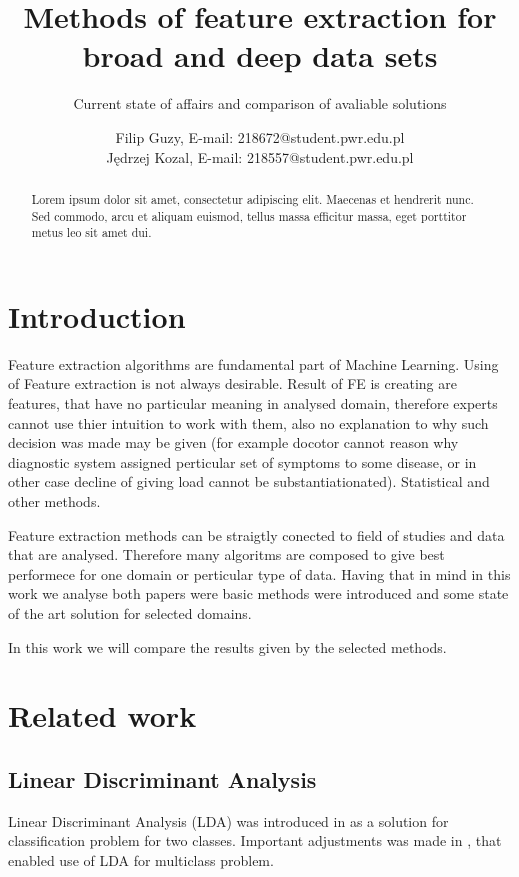 \documentclass[twocolumn]{paper}
\author{Filip Guzy, E-mail:  218672@student.pwr.edu.pl\\
Jędrzej Kozal, E-mail:  218557@student.pwr.edu.pl}
\title{Methods of feature extraction for broad and deep data sets}
\subtitle{Current state of affairs and comparison of avaliable solutions}
\begin{document}
\maketitle

\begin{abstract}
   Lorem ipsum dolor sit amet, consectetur adipiscing elit. Maecenas et hendrerit nunc. Sed commodo, arcu et aliquam euismod, tellus massa efficitur massa, eget porttitor metus leo sit amet dui.
\end{abstract}

\section{Introduction}

Feature extraction algorithms are fundamental part of Machine Learning.
Using of Feature extraction is not always desirable. Result of FE is creating are features, that have no particular meaning in analysed domain, therefore experts cannot use thier intuition to work with them, also no explanation to why such decision was made may be given (for example docotor cannot reason why diagnostic system assigned perticular set of symptoms to some disease, or in other case decline of giving load cannot be substantiationated).
Statistical and other methods.

Feature extraction methods can be straigtly conected to field of studies and data that are analysed. Therefore many algoritms are composed to give best performece for one domain or perticular type of data. Having that in mind in this work we analyse both papers were basic methods were introduced and some state of the art solution for selected domains.

In this work we will compare the results given by the selected methods.

\section{Related work}

\subsection{Linear Discriminant Analysis}

Linear Discriminant Analysis (LDA) was introduced in \cite{LDA} as a solution for classification problem for two classes. Important adjustments was made in \cite{multi_LDA}, that enabled use of LDA for multiclass problem.
\end{document}
